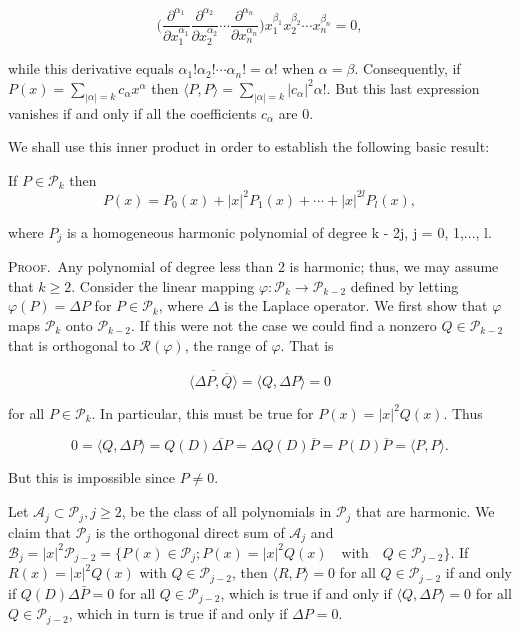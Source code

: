 \[
\biggl(\frac{\partial^{\alpha_{1}}}{\partial x_{1}^{\alpha_{1}}}\frac{\partial^{\alpha_{2}}}{\partial x_{2}^{\alpha_{2}}}\cdots\frac{\partial^{\alpha_{n}}}{\partial x_{n}^{\alpha_{n}}}\biggr)x_{1}^{\beta_{1}}x_{2}^{\beta_{2}}\cdots x_{n}^{\beta_{n}}=0,
\]

while this derivative equals $\alpha_1! \alpha_2! \cdots \alpha_n! = \alpha!$ when $\alpha = \beta$. Consequently, if $P(x) = \sum_{|\alpha| = k} c_\alpha x^\alpha$ then $\langle P, P \rangle = \sum_{|\alpha| = k} |c_\alpha|^2 \alpha!$. But this last expression vanishes if and only if all the coefficients $c_\alpha$ are 0.

We shall use this inner product in order to establish the following basic result:

\begin{theorem}
\label{thm:c4-2-1}
If $P \in \mathcal{P}_k$ then
\[
P(x)=P_{0}(x)+\left|x\right|^{2}P_{1}(x)+\cdots+\left|x\right|^{2l}P_{l}(x),
\]

where $P_j$ is a homogeneous harmonic polynomial of degree k - 2j, j = 0, 1,..., l.
\end{theorem}

\textsc{Proof.}\ Any polynomial of degree less than 2 is harmonic; thus, we may assume that $k \geq 2$. Consider the linear mapping $\varphi: \mathcal{P}_k \to \mathcal{P}_{k-2}$ defined by letting $\varphi(P) = \Delta P$ for $P \in \mathcal{P}_k$, where $\Delta$ is the Laplace operator. We first show that $\varphi$ maps $\mathcal{P}_k$ onto $\mathcal{P}_{k-2}$. If this were not the case we could find a nonzero $Q \in \mathcal{P}_{k-2}$ that is orthogonal to $\mathcal{R}(\varphi)$, the range of $\varphi$. That is

\[
\overline{\langle\Delta P,\overline{Q}\rangle}=\langle Q,\Delta P\rangle=0
\]

for all $P \in \mathcal{P}_k$. In particular, this must be true for $P(x) = |x|^2 Q(x)$. Thus

\[
0=\langle Q,\Delta P\rangle=Q(D)\overline{{\Delta P}}=\Delta Q(D)\overline{{P}}=P(D)\overline{{P}}=\langle P,P\rangle.
\]

But this is impossible since $P \neq 0$.

Let $\mathcal{A}_j \subset \mathcal{P}_j, j \geq 2$, be the class of all polynomials in $\mathcal{P}_j$ that are harmonic. We claim that $\mathcal{P}_j$ is the orthogonal direct sum of $\mathcal{A}_j$ and $\mathcal{B}_j = |x|^2 \mathcal{P}_{j-2} = \{P(x) \in \mathcal{P}_j; P(x) = |x|^2 Q(x) \quad \text{with} \quad Q \in \mathcal{P}_{j-2}\}$. If $R(x) = |x|^2 Q(x)$ with $Q \in \mathcal{P}_{j-2}$, then $\langle R, P \rangle = 0$ for all $Q \in \mathcal{P}_{j-2}$ if and only if $Q(D) \Delta \bar{P} = 0$ for all $Q \in \mathcal{P}_{j-2}$, which is true if and only if $\langle Q, \Delta P \rangle = 0$ for all $Q \in \mathcal{P}_{j-2}$, which in turn is true if and only if $\Delta P = 0$.

